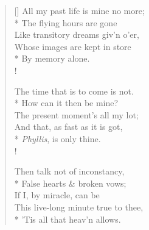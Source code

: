 \documentclass[MAIN]{subfiles}
\begin{document}
\settowidth{\versewidth}{All my past life is mine no more;}
\begin{verse}[\versewidth]
All my past life is mine no more;\\*
\vin The flying hours are gone\\
Like transitory dreams giv'n o'er,\\
Whose images are kept in store\\*
\vin By memory alone.\\!

The time that is to come is not.\\*
\vin How can it then be mine?\\
The present moment's all my lot;\\
And that, as fast as it is got,\\*
\vin \emph{Phyllis}, is only thine.\\!

Then talk not of inconstancy,\\*
\vin False hearts \& broken vows;\\
If I, by miracle, can be\\
This live-long minute true to thee,\\*
\vin 'Tis all that heav'n allows.
\end{verse}
\end{document}
